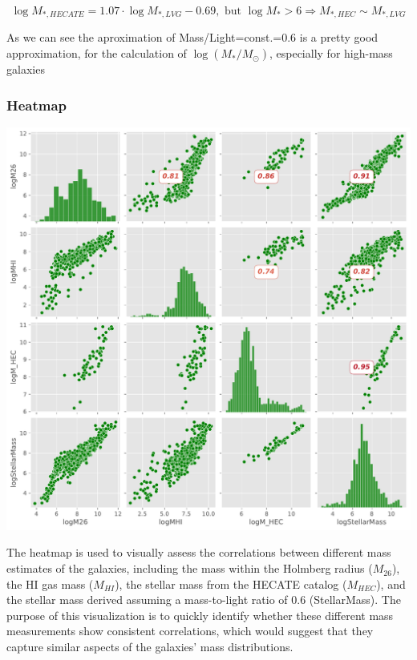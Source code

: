 \documentclass[
]{article}
\begin{document}
\[
\log{M_{*,HECATE}}=1.07\cdot\log{M_{*,LVG}}-0.69, \text{ but } \log{M_*}>6\Rightarrow M_{*,HEC}\sim M_{*,LVG}
\]

As we can see the aproximation of Mass/Light=const.=0.6 is a pretty good
approximation, for the calculation of \(\log(M_*/M_\odot)\), especially
for high-mass galaxies

\newpage{}

\subsubsection{Heatmap}

\includegraphics{compare_files/figure-pdf/cell-31-output-1.pdf}

The heatmap is used to visually assess the correlations between
different mass estimates of the galaxies, including the mass within the
Holmberg radius (\(M_{26}\)), the HI gas mass (\(M_{HI}\)\hspace{0pt}),
the stellar mass from the HECATE catalog (\(M_{HEC}\)\hspace{0pt}), and
the stellar mass derived assuming a mass-to-light ratio of 0.6
(StellarMass). The purpose of this visualization is to quickly identify
whether these different mass measurements show consistent correlations,
which would suggest that they capture similar aspects of the galaxies'
mass distributions.
\end{document}
